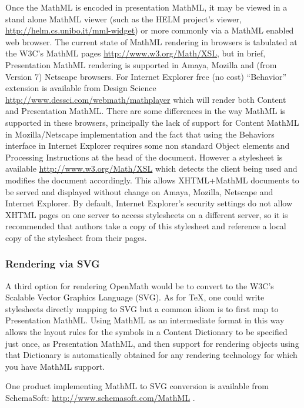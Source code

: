 \documentclass[report,keylogo]{openmath}
\begin{document}
Once the MathML is encoded in presentation MathML, it may be viewed in
a stand alone MathML viewer (such as the HELM project's viewer,
\url{http://helm.cs.unibo.it/mml-widget}) or more commonly via a MathML enabled web browser.  The
current state of MathML rendering in browsers is tabulated at the
W3C's MathML pages \url{http://www.w3.org/Math/XSL}, but in brief,
Presentation MathML rendering is supported in Amaya, Mozilla and (from
Version 7) Netscape browsers. For Internet Explorer free (no cost)
``Behavior'' extension is available from Design Science
\url{http://www.dessci.com/webmath/mathplayer} which will render both
Content and Presentation MathML. There are some differences in the way
MathML is supported in these browsers, principally the lack of support
for Content MathML in Mozilla/Netscape implementation and the fact
that using the Behaviors interface in Internet Explorer requires some
non standard Object elements and Processing Instructions at the head
of the document. However a stylesheet is available
\url{http://www.w3.org/Math/XSL} which detects the client being used
and modifies the document accordingly. This allows XHTML+MathML
documents to be served and displayed without change on Amaya, Mozilla,
Netscape and Internet Explorer. By default, Internet Explorer's
security settings do not allow XHTML pages on one server to access
stylesheets on a different server, so it is recommended that authors
take a copy of this stylesheet and reference a local copy of the
stylesheet from their pages.



\subsubsection{Rendering via SVG}

A third option for rendering OpenMath would be to convert to the W3C's
Scalable Vector Graphics Language (SVG). As for \TeX, one could write
stylesheets directly mapping to SVG but a common idiom is to first map
to Presentation MathML. Using MathML as an intermediate format in this
way allows the layout rules for the symbols in a Content Dictionary to
be specified just once, as Presentation MathML, and then support for
rendering objects using that Dictionary is automatically obtained for
any rendering technology for which you have MathML support.

One product implementing MathML to SVG conversion is available from 
SchemaSoft: \url{http://www.schemasoft.com/MathML} .
\end{document}
